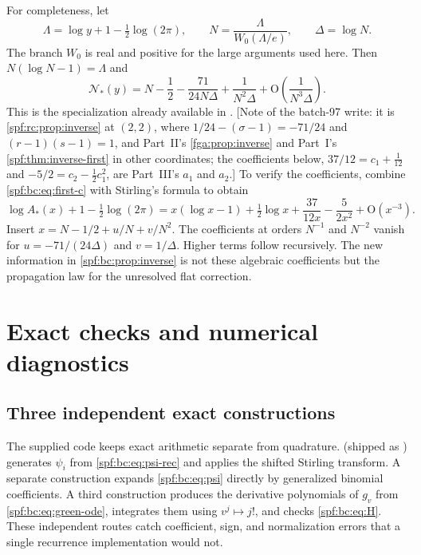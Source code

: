 \documentclass[11pt]{article}
\numberwithin{equation}{section}
\theoremstyle{definition}
\theoremstyle{remark}
\theoremstyle{definition}
\newcommand{\bigO}{\mathrm O}
\newcommand{\bcA}{A_{\!*}}
\newcommand{\bcN}{\mathcal N_{\!*}}
\begin{document}
For completeness, let
\begin{equation}
 \Lambda=\log y+1-\tfrac12\log(2\pi),\qquad
 N=\frac{\Lambda}{W_0(\Lambda/e)},\qquad \Delta=\log N.
 \label{spf:bc:eq:Lambert-coordinate}
\end{equation}
The branch $W_0$ is real and positive for the large arguments used here.
Then $N(\log N-1)=\Lambda$ and
\begin{equation}
 \bcN(y)=N-\frac12-\frac{71}{24N\Delta}+\frac1{N^2\Delta}
                      +\bigO\!\left(\frac1{N^3\Delta}\right).
 \label{spf:bc:eq:Lambert-inverse}
\end{equation}
This is the specialization already available in \cite{bcProveIt}.
[Note of the batch-97 write: it is \cref{spf:rc:prop:inverse} at $(2,2)$, where
$1/24-(\sigma-1)=-71/24$ and $(r-1)(s-1)=1$, and Part~II's
\cref{fga:prop:inverse} and Part~I's \cref{spf:thm:inverse-first} in other
coordinates; the coefficients below, $37/12=c_1+\frac1{12}$ and
$-5/2=c_2-\frac12c_1^2$, are Part~III's $a_1$ and $a_2$.] To verify the
coefficients, combine \eqref{spf:bc:eq:first-c} with Stirling's formula to obtain
\[
 \log\bcA(x)+1-\tfrac12\log(2\pi)
 =x(\log x-1)+\tfrac12\log x+\frac{37}{12x}-\frac5{2x^2}
                                      +\bigO(x^{-3}).
\]
Insert $x=N-1/2+u/N+v/N^2$. The coefficients at orders $N^{-1}$ and
$N^{-2}$ vanish for $u=-71/(24\Delta)$ and $v=1/\Delta$. Higher terms follow recursively.
The new information in \cref{spf:bc:prop:inverse} is not these algebraic coefficients
but the propagation law for the unresolved flat correction.

\section{Exact checks and numerical diagnostics}
\label{spf:bc:sec:verification}

\subsection{Three independent exact constructions}

The supplied code keeps exact arithmetic separate from quadrature.
 (shipped as )
generates $\psi_i$ from \eqref{spf:bc:eq:psi-rec} and applies
the shifted Stirling transform. A separate construction expands
\eqref{spf:bc:eq:psi} directly by generalized binomial coefficients. A third
construction produces the derivative polynomials of $g_v$ from
\eqref{spf:bc:eq:green-ode}, integrates them using $v^j\mapsto j!$, and checks
\eqref{spf:bc:eq:H}. These independent routes catch coefficient, sign, and
normalization errors that a single recurrence implementation would not.
\end{document}
